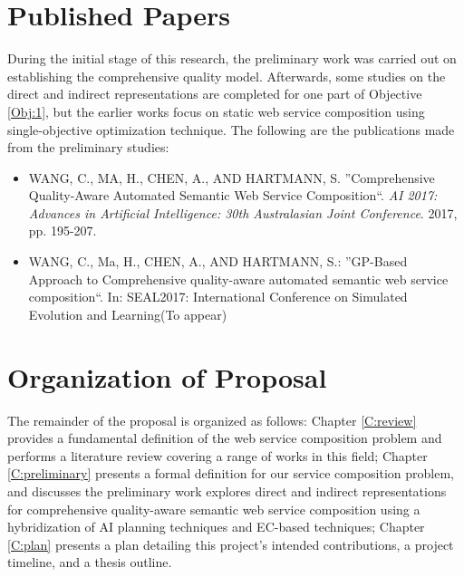 \section{Published Papers}

During the initial stage of this research, the preliminary work was carried out on establishing the comprehensive quality model.  Afterwards, some studies on the direct and indirect representations are completed for one part of Objective \ref{Obj:1}, but the earlier works focus on static web service composition using single-objective optimization technique. The following are the publications made from the preliminary studies:

\begin{itemize}
 \item WANG, C., MA, H., CHEN, A., AND HARTMANN, S. ''Comprehensive Quality-Aware Automated Semantic Web Service Composition``. \textit{AI 2017: Advances in Artificial Intelligence: 30th Australasian Joint Conference}. 2017, pp. 195-207.
 \item WANG, C., Ma, H., CHEN, A., AND HARTMANN, S.: ''GP-Based Approach to Comprehensive quality-aware automated semantic web service composition``. In: SEAL2017: International Conference on Simulated Evolution and Learning(To appear)
\end{itemize}


\section{Organization of Proposal}The remainder of the proposal is organized as follows: Chapter \ref{C:review} provides a fundamental definition of the web service composition problem and performs a literature review covering a range of works in this field; Chapter \ref{C:preliminary} presents a formal definition for our service composition problem, and discusses the preliminary work explores direct and indirect representations for comprehensive quality-aware semantic web service composition using a hybridization of AI planning techniques and EC-based techniques; Chapter \ref{C:plan} presents a plan detailing this project's intended contributions, a project timeline, and a thesis outline.
